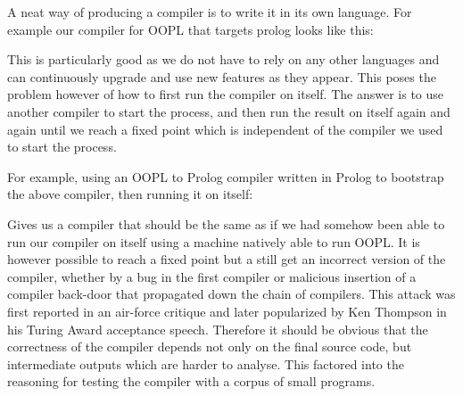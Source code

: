 \documentclass[12pt,a4paper,twoside,openright]{report}
\newcommand{\tblocktext}[3]{
    {#1} \& $\to$   \& {#2} \\
    {}     \&  {#3}   \&      \\
}
\newcommand{\tblockoutline}[1]{
    \draw (#1-1-1.south west) |- (#1-1-3.north east) |- (#1-1-3.south west) |- (#1-2-2.south west) |- (#1-1-1.south west);
}
\newcommand{\wblocktext}[1]{
    {#1} \\
    {}\\
}
\newcommand{\wblockoutline}[1]{
    \draw (#1-1-1.south west) |- (#1-1-1.north east) -- (#1-1-1.south east) -- (#1-2-1.south) -- (#1-1-1.south west);
}
\newcommand{\wsupt}[2]{
	\node(mac#2) at (#2-2-2.south west) [wblock, anchor = mac#2-1-1.north west] {\wblocktext{#1}};
	\wblockoutline{mac#2};
}
\begin{document}
A neat way of producing a compiler is to write it in its own language. For example our compiler for OOPL that targets prolog looks like this:

\begin{center}
\end{center}

This is particularly good as we do not have to rely on any other languages and can continuously upgrade and use new features as they appear. This poses the problem however of how to first run the compiler on itself. The answer is to use another compiler to start the process, and then run the result on itself again and again until we reach a fixed point which is independent of the compiler we used to start the process.

 \bigskip
 
For example, using an OOPL to Prolog compiler written in Prolog to bootstrap the above compiler, then running it on itself:

\begin{center}
\end{center}

Gives us a compiler that should be the same as if we had somehow been able to run our compiler on itself using a machine natively able to run OOPL. It is however possible to reach a fixed point but a still get an incorrect version of the compiler, whether by a bug in the first compiler or malicious insertion of a compiler back-door that propagated down the chain of compilers. This attack was first reported in an air-force critique\cite{MULTICS} and later popularized by Ken Thompson in his Turing Award acceptance speech\cite{KEN}. Therefore it should be obvious that the correctness of the compiler depends not only on the final source code, but intermediate outputs which are harder to analyse. This factored into the reasoning for testing the compiler with a corpus of small programs.
\end{document}
